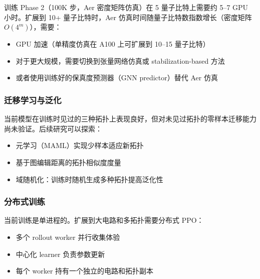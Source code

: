 训练 Phase 2（100K 步，Aer 密度矩阵仿真）在 5 量子比特上需要约 5--7 GPU 小时。扩展到 10+ 量子比特时，Aer 仿真时间随量子比特数指数增长（密度矩阵 $O(4^m)$），需要：
\begin{itemize}
  \item GPU 加速（单精度仿真在 A100 上可扩展到 10--15 量子比特）
  \item 对于更大规模，需要切换到张量网络仿真或 stabilization-based 方法
  \item 或者使用训练好的保真度预测器（GNN predictor）替代 Aer 仿真
\end{itemize}

\subsubsection{迁移学习与泛化}

当前模型在训练时见过的三种拓扑上表现良好，但对未见过拓扑的零样本迁移能力尚未验证。后续研究可以探索：
\begin{itemize}
  \item 元学习（MAML）实现少样本适应新拓扑
  \item 基于图编辑距离的拓扑相似度度量
  \item 域随机化：训练时随机生成多种拓扑提高泛化性
\end{itemize}

\subsubsection{分布式训练}

当前训练是单进程的。扩展到大电路和多拓扑需要分布式 PPO：
\begin{itemize}
  \item 多个 rollout worker 并行收集体验
  \item 中心化 learner 负责参数更新
  \item 每个 worker 持有一个独立的电路和拓扑副本
\end{itemize}
